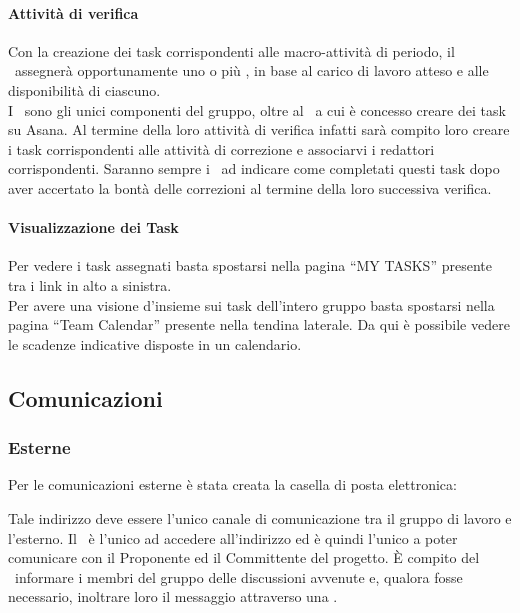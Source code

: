 \documentclass[../NormeDiProgetto.tex]{subfiles}
\begin{document}
				\paragraph{Attività di verifica\\}
					Con la creazione dei task corrispondenti alle macro-attività di periodo, il \responsabilediprogetto\ assegnerà opportunamente uno o più \verificatori, in base al carico di lavoro atteso e alle disponibilità di ciascuno. \\
					I \verificatori\ sono gli unici componenti del gruppo, oltre al \responsabilediprogetto\ a cui è concesso creare dei task su Asana. Al termine della loro attività di verifica infatti sarà compito loro creare i task corrispondenti alle attività di correzione e associarvi i redattori corrispondenti. Saranno sempre i \verificatori\ ad indicare come completati questi task dopo aver accertato la bontà delle correzioni al termine della loro successiva verifica.
				\paragraph{Visualizzazione dei Task\\}
				Per vedere i task assegnati basta spostarsi nella pagina ``MY
				TASKS'' presente tra i link in alto a sinistra.\\
				Per avere una visione d'insieme sui task dell'intero gruppo basta
				spostarsi nella pagina ``Team Calendar'' presente nella tendina
				laterale. Da qui è possibile vedere le scadenze indicative disposte
				in un calendario.
				
		\subsection{Comunicazioni}
			\subsubsection{Esterne}
				Per le comunicazioni esterne è stata creata la casella di posta
				elettronica:
				\begin{center}
					\mailkaleidoscode
				\end{center}
				Tale indirizzo deve essere l'unico canale di comunicazione tra il
				gruppo di lavoro e l'esterno.
				Il \responsabilediprogetto\ è l'unico ad accedere
				all'indirizzo ed è quindi l'unico a poter comunicare con il Proponente ed il
				Committente del progetto. È compito del \responsabilediprogetto\ informare
				i membri del gruppo delle discussioni avvenute e,
				qualora fosse necessario, inoltrare loro il messaggio attraverso
				una .
\end{document}
